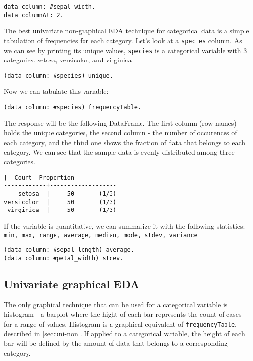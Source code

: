 \documentclass[sigplan]{acmart}
\begin{document}
\begin{lstlisting}[basicstyle=\small,language=Smalltalk]
data column: #sepal_width.
data columnAt: 2.
\end{lstlisting}

The best univariate non-graphical EDA technique for categorical data is a simple tabulation of frequencies for each category\cite{Seltman}. Let's look at a \texttt{species} column. As we can see by printing its unique values, \texttt{species} is a categorical variable with 3 categories: setosa, versicolor, and virginica

\begin{lstlisting}[basicstyle=\small,language=Smalltalk]
(data column: #species) unique.
\end{lstlisting}

Now we can tabulate this variable:

\begin{lstlisting}[basicstyle=\small,language=Smalltalk]
(data column: #species) frequencyTable.
\end{lstlisting}

The response will be the following DataFrame. The first column (row names) holds the unique categories, the second column - the number of occurences of each category, and the third one shows the fraction of data that belongs to each category. We can see that the sample data is evenly distributed among three categories.

\begin{lstlisting}[basicstyle=\small, belowskip=1em,]
            |  Count  Proportion  
------------+-------------------
    setosa  |     50       (1/3)  
versicolor  |     50       (1/3)  
 virginica  |     50       (1/3)
\end{lstlisting}

If the variable is quantitative, we can summarize it with the following statistics: \texttt{min, max, range, average, median, mode, stdev, variance}

\begin{lstlisting}[basicstyle=\small,language=Smalltalk]
(data column: #sepal_length) average. 
(data column: #petal_width) stdev.
\end{lstlisting}

\subsection{Univariate graphical EDA}
\label{sec:uni-graph}

The only graphical technique that can be used for a categorical variable is histogram - a barplot where the hight of each bar represents the count of cases for a range of values. Histogram is a graphical equivalent of \texttt{frequencyTable}, described in \ref{sec:uni-non}. If applied to a categorical variable, the height of each bar will be defined by the amount of data that belongs to a corresponding category.
\end{document}
